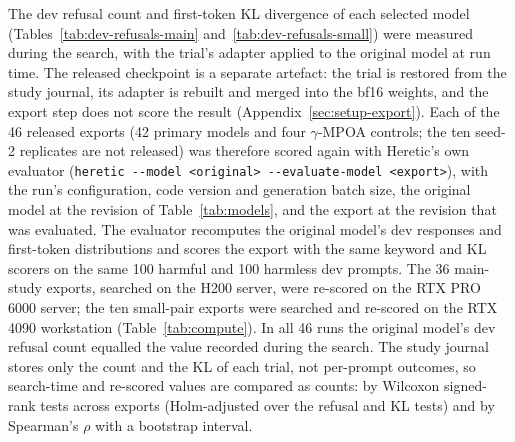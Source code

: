 The dev refusal count and first-token KL divergence of each selected model
(Tables~\ref{tab:dev-refusals-main} and~\ref{tab:dev-refusals-small}) were
measured during the search, with the trial's adapter applied to the original
model at run time. The released checkpoint is a separate artefact: the trial is
restored from the study journal, its adapter is rebuilt and merged into the
bf16 weights, and the export step does not score the result
(Appendix~\ref{sec:setup-export}). Each of the 46 released exports (42 primary
models and four $\gamma$-MPOA controls; the ten seed-2 replicates are not
released) was therefore scored again with Heretic's own evaluator
(\texttt{heretic -{}-model <original> -{}-evaluate-model <export>}), with the run's
configuration, code version and generation batch size, the original model at
the revision of Table~\ref{tab:models}, and the export at the revision that was
evaluated. The evaluator recomputes the original model's dev responses and
first-token distributions and scores the export with the same keyword and KL
scorers on the same 100 harmful and 100 harmless dev prompts. The 36
main-study exports, searched on the H200 server, were re-scored on the RTX PRO
6000 server; the ten small-pair exports were searched and re-scored on the RTX
4090 workstation (Table~\ref{tab:compute}). In all 46 runs the original model's
dev refusal count equalled the value recorded during the search. The study
journal stores only the count and the KL of each trial, not per-prompt
outcomes, so search-time and re-scored values are compared as counts: by
Wilcoxon signed-rank tests across exports (Holm-adjusted over the refusal and KL
tests) and by Spearman's $\rho$ with a bootstrap interval.

